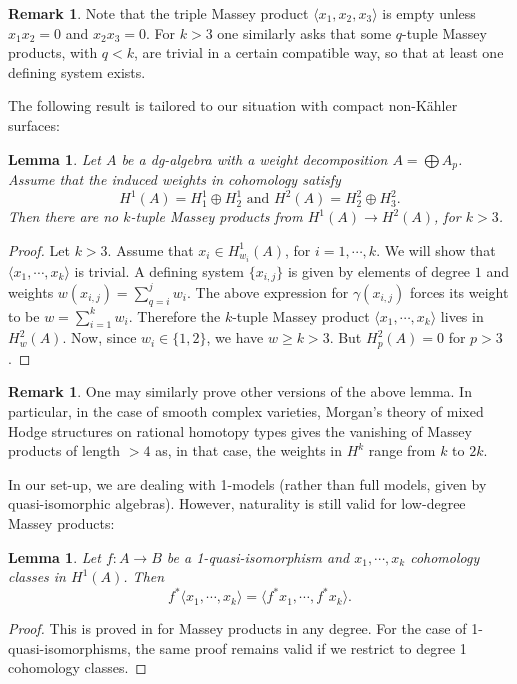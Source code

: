 \documentclass[a4paper]{amsart}
\newtheorem{lemm}[theo]{Lemma}
\theoremstyle{definition}
\newtheorem{rema}[theo]{Remark}
\begin{document}
\begin{rema}
Note that the triple Massey product $\langle x_1,x_2,x_3\rangle$ is empty unless
$x_1x_2=0$ and $x_2x_3=0$. For $k>3$ one similarly asks that some $q$-tuple Massey products, with $q<k$,
are trivial in a certain compatible way, so that at least one defining system exists.
\end{rema}

The following result is tailored to our situation with compact non-Kähler surfaces:

\begin{lemm}
 Let $A$ be a dg-algebra with a weight decomposition 
 $A=\bigoplus A_p$. Assume that the induced weights in cohomology satisfy 
 \[H^1(A)=H^1_1\oplus H^1_2\text{ and }H^2(A)=H^2_2\oplus H^2_3.\]
 Then 
 there are no $k$-tuple Massey products from $H^1(A)\to H^2(A)$, for $k>3$.
\end{lemm}
\begin{proof}Let $k>3$.
Assume that $x_i\in H^1_{w_i}(A)$, for $i=1,\cdots,k$.
We will show that $\langle x_1,\cdots,x_k\rangle$ is trivial. 
A defining system $\{x_{i,j}\}$ is given by elements of degree $1$ and weights $w(x_{i,j})=\sum_{q=i}^j w_i$. The above expression for $\gamma(x_{i,j})$ forces its weight to be
$w=\sum_{i=1}^k w_i$.
Therefore the $k$-tuple Massey product $\langle x_1,\cdots,x_k\rangle$ lives in
$H^{2}_w(A)$.
Now, since $w_i\in\{1,2\}$, we have $w\geq k>3$. But $H^2_p(A)=0$ for $p>3$.
\end{proof}

\begin{rema}
One may similarly prove other versions of the above lemma. In particular, in the case of smooth complex varieties, Morgan's theory of mixed Hodge structures on rational homotopy types gives the vanishing of Massey products of length $>4$ as, in that case, the weights in $H^k$ range from $k$ to $2k$.
\end{rema}


In our set-up, we are dealing with 1-models (rather than full models, given by quasi-isomorphic algebras). However, 
naturality is still valid for low-degree Massey products:
\begin{lemm}
 Let $f:A\to B$ be a 1-quasi-isomorphism and $x_1,\cdots,x_k$ cohomology classes in $H^1(A)$. Then
 \[f^*\langle x_1,\cdots,x_k\rangle=\langle f^* x_1,\cdots,f^* x_k\rangle.\]
\end{lemm}
\begin{proof}
This is proved in \cite{Kraines} for Massey products in any degree. For the case of 1-quasi-isomorphisms, the same proof remains valid if we restrict to degree 1 cohomology classes.
\end{proof}
\end{document}
